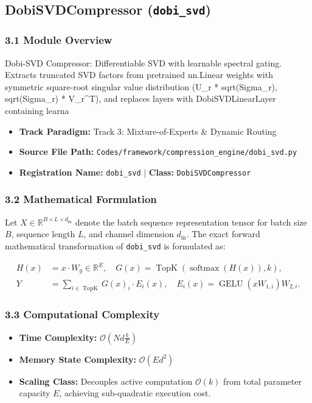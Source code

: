 \subsection{DobiSVDCompressor (\texttt{dobi\_svd})}
\label{sec:app_module_dobi_svd}

\subsubsection*{3.1 Module Overview}
Dobi-SVD Compressor: Differentiable SVD with learnable spectral gating.  Extracts truncated SVD factors from pretrained nn.Linear weights with symmetric square-root singular value distribution (U\_r * sqrt(Sigma\_r), sqrt(Sigma\_r) * V\_r^T), and replaces layers with DobiSVDLinearLayer containing learna
\begin{itemize}
    \item \textbf{Track Paradigm:} Track 3: Mixture-of-Experts & Dynamic Routing
    \item \textbf{Source File Path:} \texttt{Codes/framework/compression\_engine/dobi\_svd.py}
    \item \textbf{Registration Name:} \texttt{dobi\_svd} $\mid$ \textbf{Class:} \texttt{DobiSVDCompressor}
\end{itemize}

\subsubsection*{3.2 Mathematical Formulation}
Let $X \in \mathbb{R}^{B \times L \times d_{\text{in}}}$ denote the batch sequence representation tensor for batch size $B$, sequence length $L$, and channel dimension $d_{\text{in}}$. The exact forward mathematical transformation of \texttt{dobi\_svd} is formulated as:

\begin{align}
H(x) &= x \cdot W_g \in \mathbb{R}^{E}, \quad G(x) = \operatorname{TopK}\left(\operatorname{softmax}(H(x)), k\right), \\
Y &= \sum_{i \in \operatorname{TopK}} G(x)_i \cdot E_i(x), \quad E_i(x) = \operatorname{GELU}(x W_{1, i}) W_{2, i}.
\end{align}


\subsubsection*{3.3 Computational Complexity}
\begin{itemize}
    \item \textbf{Time Complexity:} $\mathcal{O}(N d \frac{k}{E})$
    \item \textbf{Memory State Complexity:} $\mathcal{O}(E d^2)$
    \item \textbf{Scaling Class:} Decouples active computation $\mathcal{O}(k)$ from total parameter capacity $E$, achieving sub-quadratic execution cost.
\end{itemize}

